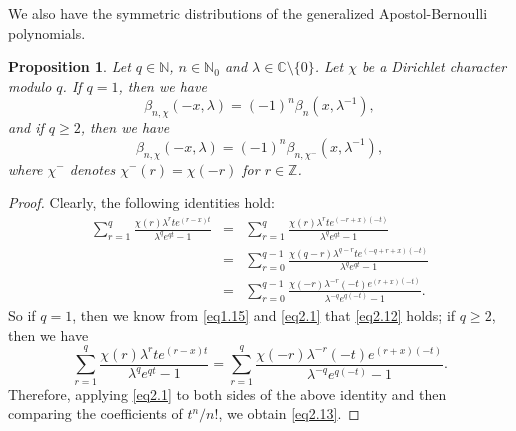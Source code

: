 \documentclass[reqno]{amsart}
\numberwithin{equation}{section}
\newtheorem{proposition}[thm]{Proposition}
\begin{document}
We also have the symmetric distributions of the generalized Apostol-Bernoulli polynomials.

\begin{proposition}\label{pro2.3} Let $q\in\mathbb{N}$, $n\in\mathbb{N}_{0}$ and $\lambda\in\mathbb{C}\setminus\{0\}$. Let $\chi$ be a Dirichlet character modulo $q$. If $q=1$, then we have
\begin{equation}\label{eq2.12}
\beta_{n,\chi}(-x,\lambda)=(-1)^{n}\beta_{n}(x,\lambda^{-1}),
\end{equation}
and if $q\geqslant2$, then we have
\begin{equation}\label{eq2.13}
\beta_{n,\chi}(-x,\lambda)=(-1)^{n}\beta_{n,\chi^{-}}(x,\lambda^{-1}),
\end{equation}
where $\chi^{-}$ denotes $\chi^{-}(r)=\chi(-r)$ for $r\in\mathbb{Z}$.
\end{proposition}

\begin{proof}
Clearly, the following identities hold:
\begin{eqnarray*}
\sum_{r=1}^{q}\frac{\chi(r)\lambda^{r}te^{(r-x)t}}{\lambda^{q}e^{qt}-1}
&=&\sum_{r=1}^{q}\frac{\chi(r)\lambda^{r}te^{(-r+x)(-t)}}{\lambda^{q}e^{qt}-1}\nonumber\\
&=&\sum_{r=0}^{q-1}\frac{\chi(q-r)\lambda^{q-r}te^{(-q+r+x)(-t)}}{\lambda^{q}e^{qt}-1}\nonumber\\
&=&\sum_{r=0}^{q-1}\frac{\chi(-r)\lambda^{-r}(-t)e^{(r+x)(-t)}}{\lambda^{-q}e^{q(-t)}-1}.
\end{eqnarray*}
So if $q=1$, then we know from \eqref{eq1.15} and \eqref{eq2.1} that \eqref{eq2.12} holds; if $q\geqslant2$, then we have
\begin{equation*}
\sum_{r=1}^{q}\frac{\chi(r)\lambda^{r}te^{(r-x)t}}{\lambda^{q}e^{qt}-1}
=\sum_{r=1}^{q}\frac{\chi(-r)\lambda^{-r}(-t)e^{(r+x)(-t)}}{\lambda^{-q}e^{q(-t)}-1}.
\end{equation*}
Therefore, applying \eqref{eq2.1} to both sides of the above identity and then comparing the coefficients of $t^{n}/n!$, we obtain \eqref{eq2.13}.
\end{proof}
\end{document}
